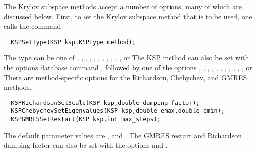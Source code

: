 The Krylov subspace methods accept a number of options, many of which 
are discussed below.  First, to set the Krylov subspace method that is to 
be used, one calls the command 
\begin{verbatim}
  KSPSetType(KSP ksp,KSPType method);
\end{verbatim}
The type can be one of , , , , 
, , , , , , , or 
  
   
  
The KSP method can also be set with the options database command 
,
followed by one of the options , , , , , 
, , , , , , or  
There are method-specific options for the Richardson, Chebychev,
and GMRES  
methods.    
\begin{verbatim}
  KSPRichardsonSetScale(KSP ksp,double damping_factor);
  KSPChebychevSetEigenvalues(KSP ksp,double emax,double emin);
  KSPGMRESSetRestart(KSP ksp,int max_steps);
\end{verbatim}
The default parameter values are , and . The GMRES 
 restart and Richardson damping factor
can also be set with the options 
and .  

